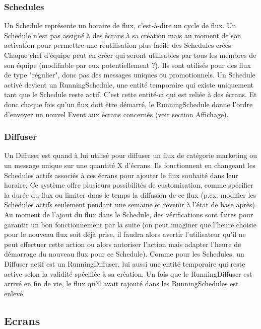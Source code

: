 \documentclass[french]{article}
\begin{document}
\subsubsection{Schedules}
Un Schedule représente un horaire de flux, c'est-à-dire un cycle de flux. Un Schedule n'est pas assigné à des écrans à sa création mais au moment de son activation pour permettre  une réutilisation plus facile des Schedules créés. Chaque chef d'équipe peut en créer qui seront utilisables par tous les membres de son équipe (modifiable par eux potentiellement ?). Ils sont utilisés pour des flux de type "régulier", donc pas des messages uniques ou promotionnels. \newline
Un Schedule activé devient un RunningSchedule, une entité temporaire qui existe uniquement tant que le Schedule reste actif. C'est cette entité-ci qui est reliée à des écrans. Et donc chaque fois qu'un flux doit être démarré, le RunningSchedule donne l'ordre d'envoyer un nouvel Event aux écrans concernés (voir section Affichage). 

\subsubsection{Diffuser}
Un Diffuser est quand à lui utilisé pour diffuser un flux de catégorie marketing ou un message unique sur une quantité X d'écrans. Ils fonctionnent en changeant les Schedules actifs associés à ces écrans pour ajouter le flux souhaité dans leur horaire. Ce système offre plusieurs possibilités de customisation, comme spécifier la durée du flux ou limiter dans le temps la diffusion de ce flux (p.ex. modifier les Schedules actifs seulement pendant une semaine et revenir à l'état de base après). Au moment de l'ajout du flux dans le Schedule, des vérifications sont faites pour garantir un bon fonctionnement par la suite (on peut imaginer que l'heure choisie pour le nouveau flux soit déjà prise, il faudra alors avertir l'utilisateur qu'il ne peut effectuer cette action ou alors autoriser l'action mais adapter l'heure de démarrage du nouveau flux pour ce Schedule). \newline
Comme pour les Schedules, un Diffuser actif est un RunningDiffuser, lui aussi une entité temporaire qui reste active selon la validité spécifiée à sa création. Un fois que le RunningDiffuser est arrivé en fin de vie, le flux qu'il avait rajouté dans les RunningSchedules est enlevé.


\subsection{Ecrans}
\end{document}
